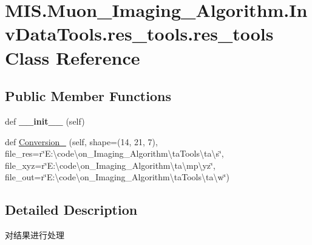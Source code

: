 \hypertarget{classMIS_1_1Muon__Imaging__Algorithm_1_1InvDataTools_1_1res__tools_1_1res__tools}{}\section{M\+I\+S.\+Muon\+\_\+\+Imaging\+\_\+\+Algorithm.\+Inv\+Data\+Tools.\+res\+\_\+tools.\+res\+\_\+tools Class Reference}
\label{classMIS_1_1Muon__Imaging__Algorithm_1_1InvDataTools_1_1res__tools_1_1res__tools}
\subsection*{Public Member Functions}
\begin{DoxyCompactItemize}
\item 
\mbox{\label{classMIS_1_1Muon__Imaging__Algorithm_1_1InvDataTools_1_1res__tools_1_1res__tools_a3ac1454ed97d41d8995b67277c6d1009}} 
def {\bfseries \+\_\+\+\_\+init\+\_\+\+\_\+} (self)
\item 
def \hyperlink{classMIS_1_1Muon__Imaging__Algorithm_1_1InvDataTools_1_1res__tools_1_1res__tools_a1e341a40e6d5a5c8ae4b5faf29c70f6e}{Conversion\+\_} (self, shape=(14, 21, 7), file\+\_\+res=r\char`\"{}E\+:\textbackslash{}code\textbackslash{}on\+\_\+\+Imaging\+\_\+\+Algorithm\textbackslash{}ta\+Tools\textbackslash{}ta\textbackslash{}s\char`\"{}, file\+\_\+xyz=r\char`\"{}E\+:\textbackslash{}code\textbackslash{}on\+\_\+\+Imaging\+\_\+\+Algorithm\textbackslash{}ta\textbackslash{}mp\textbackslash{}yz\char`\"{}, file\+\_\+out=r\char`\"{}E\+:\textbackslash{}code\textbackslash{}on\+\_\+\+Imaging\+\_\+\+Algorithm\textbackslash{}ta\+Tools\textbackslash{}ta\textbackslash{}w\char`\"{})
\end{DoxyCompactItemize}


\subsection{Detailed Description}
\begin{DoxyVerb}对结果进行处理\end{DoxyVerb}
 

